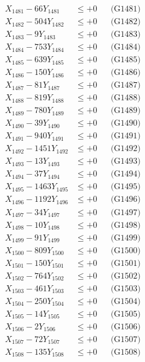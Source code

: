 \documentclass[a4paper,10pt]{article}
\begin{document}
{\begin{align}
\allowbreak
X_{1481} - 66Y_{1481} &\leq +0 && \text{(G1481)} \\
X_{1482} - 504Y_{1482} &\leq +0 && \text{(G1482)} \\
X_{1483} - 9Y_{1483} &\leq +0 && \text{(G1483)} \\
X_{1484} - 753Y_{1484} &\leq +0 && \text{(G1484)} \\
X_{1485} - 639Y_{1485} &\leq +0 && \text{(G1485)} \\
X_{1486} - 150Y_{1486} &\leq +0 && \text{(G1486)} \\
X_{1487} - 81Y_{1487} &\leq +0 && \text{(G1487)} \\
X_{1488} - 819Y_{1488} &\leq +0 && \text{(G1488)} \\
X_{1489} - 780Y_{1489} &\leq +0 && \text{(G1489)} \\
X_{1490} - 39Y_{1490} &\leq +0 && \text{(G1490)} \\
\allowbreak
X_{1491} - 940Y_{1491} &\leq +0 && \text{(G1491)} \\
X_{1492} - 1451Y_{1492} &\leq +0 && \text{(G1492)} \\
X_{1493} - 13Y_{1493} &\leq +0 && \text{(G1493)} \\
X_{1494} - 37Y_{1494} &\leq +0 && \text{(G1494)} \\
X_{1495} - 1463Y_{1495} &\leq +0 && \text{(G1495)} \\
X_{1496} - 1192Y_{1496} &\leq +0 && \text{(G1496)} \\
X_{1497} - 34Y_{1497} &\leq +0 && \text{(G1497)} \\
X_{1498} - 10Y_{1498} &\leq +0 && \text{(G1498)} \\
X_{1499} - 91Y_{1499} &\leq +0 && \text{(G1499)} \\
X_{1500} - 809Y_{1500} &\leq +0 && \text{(G1500)} \\
\allowbreak
X_{1501} - 150Y_{1501} &\leq +0 && \text{(G1501)} \\
X_{1502} - 764Y_{1502} &\leq +0 && \text{(G1502)} \\
X_{1503} - 461Y_{1503} &\leq +0 && \text{(G1503)} \\
X_{1504} - 250Y_{1504} &\leq +0 && \text{(G1504)} \\
X_{1505} - 14Y_{1505} &\leq +0 && \text{(G1505)} \\
X_{1506} - 2Y_{1506} &\leq +0 && \text{(G1506)} \\
X_{1507} - 72Y_{1507} &\leq +0 && \text{(G1507)} \\
X_{1508} - 135Y_{1508} &\leq +0 && \text{(G1508)} \\

\end{align}}
\end{document}
